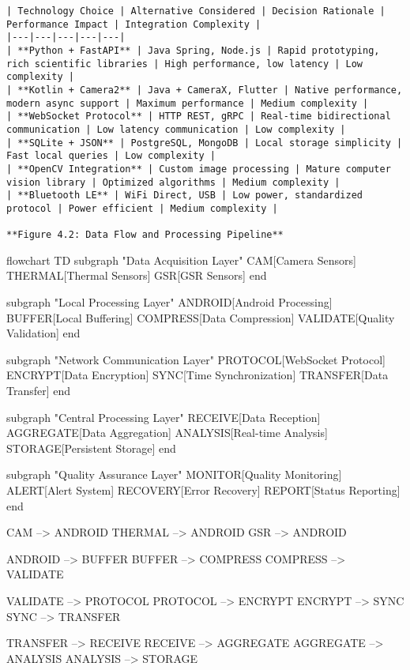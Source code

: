 \documentclass[11pt,a4paper]{report}
\begin{document}
\begin{itemize}
\begin{verbatim}
| Technology Choice | Alternative Considered | Decision Rationale | Performance Impact | Integration Complexity |
|---|---|---|---|---|
| **Python + FastAPI** | Java Spring, Node.js | Rapid prototyping, rich scientific libraries | High performance, low latency | Low complexity |
| **Kotlin + Camera2** | Java + CameraX, Flutter | Native performance, modern async support | Maximum performance | Medium complexity |
| **WebSocket Protocol** | HTTP REST, gRPC | Real-time bidirectional communication | Low latency communication | Low complexity |
| **SQLite + JSON** | PostgreSQL, MongoDB | Local storage simplicity | Fast local queries | Low complexity |
| **OpenCV Integration** | Custom image processing | Mature computer vision library | Optimized algorithms | Medium complexity |
| **Bluetooth LE** | WiFi Direct, USB | Low power, standardized protocol | Power efficient | Medium complexity |

**Figure 4.2: Data Flow and Processing Pipeline**

\end{verbatim}
\end{itemize}
flowchart TD
    subgraph "Data Acquisition Layer"
        CAM[Camera Sensors]
        THERMAL[Thermal Sensors]
        GSR[GSR Sensors]
    end

    subgraph "Local Processing Layer"
        ANDROID[Android Processing]
        BUFFER[Local Buffering]
        COMPRESS[Data Compression]
        VALIDATE[Quality Validation]
    end

    subgraph "Network Communication Layer"
        PROTOCOL[WebSocket Protocol]
        ENCRYPT[Data Encryption]
        SYNC[Time Synchronization]
        TRANSFER[Data Transfer]
    end

    subgraph "Central Processing Layer"
        RECEIVE[Data Reception]
        AGGREGATE[Data Aggregation]
        ANALYSIS[Real-time Analysis]
        STORAGE[Persistent Storage]
    end

    subgraph "Quality Assurance Layer"
        MONITOR[Quality Monitoring]
        ALERT[Alert System]
        RECOVERY[Error Recovery]
        REPORT[Status Reporting]
    end

    CAM --> ANDROID
    THERMAL --> ANDROID
    GSR --> ANDROID

    ANDROID --> BUFFER
    BUFFER --> COMPRESS
    COMPRESS --> VALIDATE

    VALIDATE --> PROTOCOL
    PROTOCOL --> ENCRYPT
    ENCRYPT --> SYNC
    SYNC --> TRANSFER

    TRANSFER --> RECEIVE
    RECEIVE --> AGGREGATE
    AGGREGATE --> ANALYSIS
    ANALYSIS --> STORAGE
\end{document}

